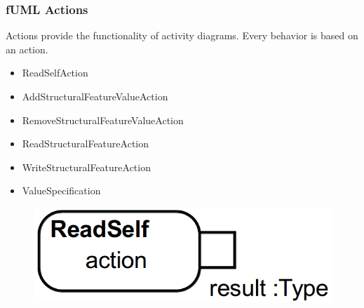 \documentclass{beamer}
\begin{document}
\begin{frame}
 \frametitle{fUML Actions}
 Actions provide the functionality of activity diagrams. Every behavior is based on an action.
 \begin{itemize}
  \item ReadSelfAction
  \item AddStructuralFeatureValueAction
  \item RemoveStructuralFeatureValueAction
  \item ReadStructuralFeatureAction
  \item WriteStructuralFeatureAction
  \item ValueSpecification
 \end{itemize}
\begin{figure}[h!t]
 \centering
 \includegraphics[scale=0.18]{images/fuml-actions/ReadSelf.png}
\end{figure}
\end{frame}
\end{document}
